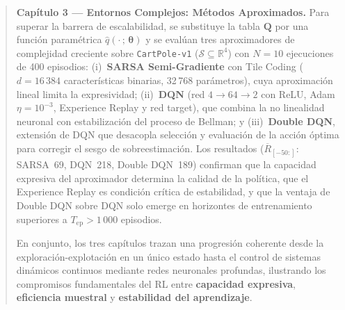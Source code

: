 \begin{abstract}
\medskip
\noindent
\textbf{Capítulo 3 — Entornos Complejos: Métodos Aproximados.}
Para superar la barrera de escalabilidad, se substituye la tabla $\mathbf{Q}$ por una función paramétrica $\hat{q}(\cdot\,;\,\boldsymbol{\theta})$ y se evalúan tres aproximadores de complejidad creciente sobre \texttt{CartPole-v1} ($\mathcal{S} \subseteq \mathbb{R}^4$) con $N = 10$ ejecuciones de 400 episodios: (i)~\textbf{SARSA Semi-Gradiente} con Tile Coding ($d = 16\,384$ características binarias, 32\,768 parámetros), cuya aproximación lineal limita la expresividad; (ii)~\textbf{DQN} (red $4 \to 64 \to 2$ con ReLU, Adam $\eta = 10^{-3}$, Experience Replay y red target), que combina la no linealidad neuronal con estabilización del proceso de Bellman; y (iii)~\textbf{Double DQN}, extensión de DQN que desacopla selección y evaluación de la acción óptima para corregir el sesgo de sobreestimación. Los resultados ($\overline{R}_{[-50:]}$: SARSA~69, DQN~218, Double DQN~189) confirman que la capacidad expresiva del aproximador determina la calidad de la política, que el Experience Replay es condición crítica de estabilidad, y que la ventaja de Double DQN sobre DQN solo emerge en horizontes de entrenamiento superiores a $T_\text{ep} > 1\,000$ episodios.

\medskip
\noindent
En conjunto, los tres capítulos trazan una progresión coherente desde la exploración-explotación en un único estado hasta el control de sistemas dinámicos continuos mediante redes neuronales profundas, ilustrando los compromisos fundamentales del RL entre \textbf{capacidad expresiva}, \textbf{eficiencia muestral} y \textbf{estabilidad del aprendizaje}.
\end{abstract}
